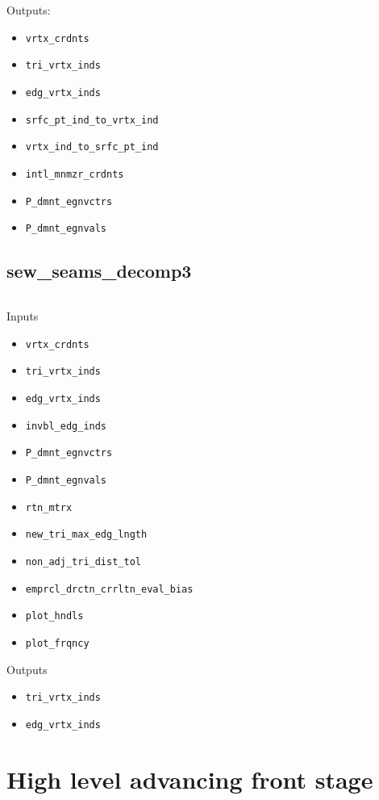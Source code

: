 \documentclass[11pt]{amsart}
\begin{document}
Outputs:
\begin{itemize}
\item
\verb+vrtx_crdnts+
\item
\verb+tri_vrtx_inds+
\item
\verb+edg_vrtx_inds+
\item
\verb+srfc_pt_ind_to_vrtx_ind+
\item
\verb+vrtx_ind_to_srfc_pt_ind+
\item
\verb+intl_mnmzr_crdnts+
\item
\verb+P_dmnt_egnvctrs+
\item
\verb+P_dmnt_egnvals+
\end{itemize}


\subsection*{sew\_seams\_decomp3} $ $

\noindent
Inputs
\begin{itemize}
\item
\verb+vrtx_crdnts+
\item
\verb+tri_vrtx_inds+
\item
\verb+edg_vrtx_inds+
\item
\verb+invbl_edg_inds+
\item
\verb+P_dmnt_egnvctrs+
\item
\verb+P_dmnt_egnvals+
\item
\verb+rtn_mtrx+
\item
\verb+new_tri_max_edg_lngth+
\item
\verb+non_adj_tri_dist_tol+
\item
\verb+emprcl_drctn_crrltn_eval_bias+
\item
\verb+plot_hndls+
\item
\verb+plot_frqncy+
\end{itemize}

\noindent
Outputs
\begin{itemize}
\item
\verb+tri_vrtx_inds+
\item
\verb+edg_vrtx_inds+
\end{itemize}


\section{High level advancing front stage}

%
\end{document}
